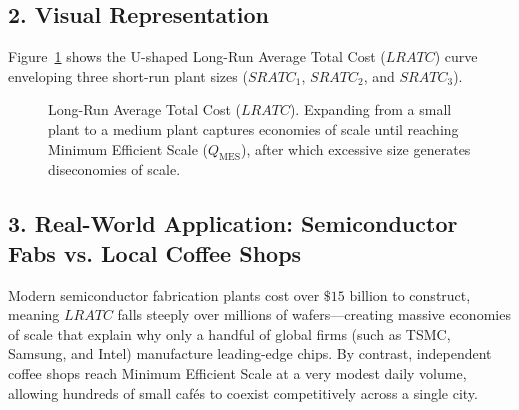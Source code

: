 \documentclass[11pt,letterpaper]{article}
\begin{document}
\subsection*{2. Visual Representation}
Figure~\ref{fig:long_run_atc} shows the U-shaped Long-Run Average Total Cost ($LRATC$) curve enveloping three short-run plant sizes ($SRATC_1$, $SRATC_2$, and $SRATC_3$).

\begin{figure}[htbp]
\centering
{}
\caption{Long-Run Average Total Cost ($LRATC$). Expanding from a small plant to a medium plant captures economies of scale until reaching Minimum Efficient Scale ($Q_{\text{MES}}$), after which excessive size generates diseconomies of scale.}
\label{fig:long_run_atc}
\end{figure}

\subsection*{3. Real-World Application: Semiconductor Fabs vs. Local Coffee Shops}
Modern semiconductor fabrication plants cost over $\$15\text{ billion}$ to construct, meaning $LRATC$ falls steeply over millions of wafers—creating massive economies of scale that explain why only a handful of global firms (such as TSMC, Samsung, and Intel) manufacture leading-edge chips. By contrast, independent coffee shops reach Minimum Efficient Scale at a very modest daily volume, allowing hundreds of small cafés to coexist competitively across a single city.
\end{document}
